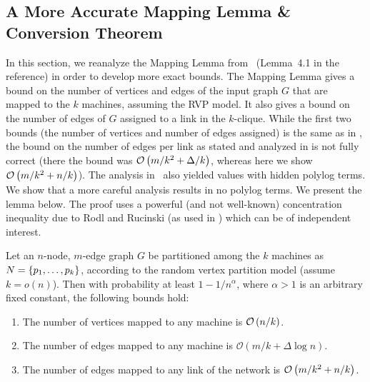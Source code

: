 \subsection{A More Accurate Mapping Lemma \& Conversion Theorem}\label{sec:more-acc-mapping-lemma}
In this section, we reanalyze the Mapping Lemma from~\cite{KlauckNPR15} (Lemma~4.1 in the reference) in order to develop more exact bounds. The Mapping Lemma gives a bound on the  number 
of vertices and  edges of the input graph $G$ that are mapped to the $k$ machines, assuming
the RVP model. It also gives a bound on the number of edges of $G$ assigned to a link in the $k$-clique. While the first two bounds (the number of vertices and number of edges assigned)
is the same as in \cite{KlauckNPR15}, the bound on the number of edges per link
as stated  and analyzed in \cite{KlauckNPR15} is not fully correct (there the bound was
\(\mathcal{O}\left(m/k^2 + \Delta/k\right)\), whereas here we show \(\mathcal{O}\left(m/k^2 + n/k\right)\)).  The analysis in~\cite{KlauckNPR15} also yielded values with hidden polylog terms. We show that a more careful analysis results in no polylog terms. We present the lemma below. 
 The proof uses a powerful (and not well-known) concentration inequality due
to Rodl and Rucinski \cite{RR94} (as used in \cite{PRS21}) which can be of independent interest.

\begin{lemma}
    \label{lem:more-acc-mapping-lemma}
Let an \(n\)-node, \(m\)-edge graph \(G\) be partitioned among the \(k\) machines as \(N = \left\lbrace p_1, \ldots, p_k\right\rbrace\), according to the random vertex partition model (assume \(k = o\left(n\right)\)). Then with probability at least \(1 - 1/n^\alpha\), where \(\alpha > 1\) is an arbitrary fixed constant, the following bounds hold:
\begin{enumerate}
    \item The number of vertices mapped to any machine is \(\mathcal{O}\left(n/k\right)\).
    \item The number of edges mapped to any machine is \(\mathcal{O}(m/k + \Delta \log n)\).
    \item The number of edges mapped to any link of the network is \(\mathcal{O}\left(m/k^2 + n/k\right)\).
\end{enumerate}
\end{lemma}

